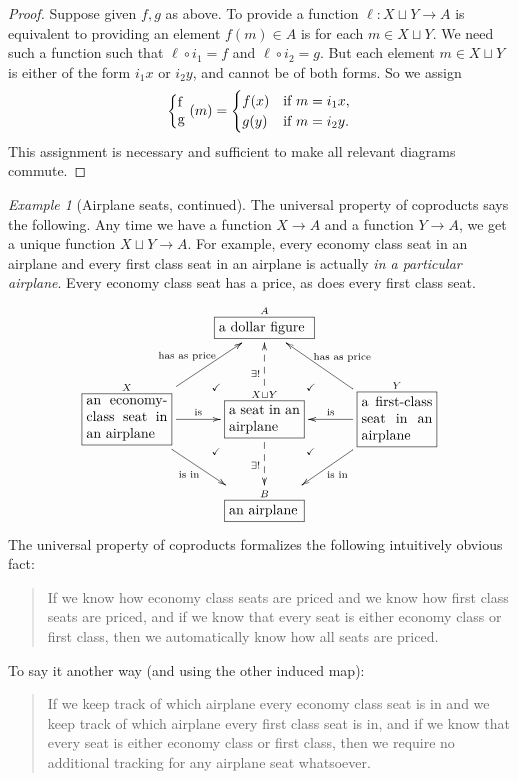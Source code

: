 \documentclass{book}
\def\tn{\textnormal}
\def\to{\rightarrow}
\def\taking{\colon}
\newcommand{\LA}[2]{\ar[#1]^-{\tn {#2}}}
\newcommand{\LAL}[2]{\ar[#1]_-{\tn {#2}}}
\newcommand{\obox}[3]{\stackrel{#1}{\fbox{\parbox{#2}{#3}}}}
\newcommand{\coprodmap}[2]{{\left\{\parbox{.1in}{#1\\#2}\right.}}
\theoremstyle{remark}
\newtheorem{example}[subsubsection]{Example}
\theoremstyle{definition}
\begin{document}
\begin{proof}

Suppose given $f,g$ as above. To provide a function $\ell\taking X\sqcup Y\to A$ is equivalent to providing an element $f(m)\in A$ is for each $m\in X\sqcup Y$. We need such a function such that $\ell\circ i_1=f$ and $\ell\circ i_2=g$. But each element $m\in X\sqcup Y$ is either of the form $i_1x$ or $i_2y$, and cannot be of both forms. So we assign 
$$\coprodmap{f}{g}(m)=\begin{cases}f(x)&\tn{if } m=i_1x,\\ g(y) &\tn{if }m=i_2y.\end{cases}$$
This assignment is necessary and sufficient to make all relevant diagrams commute.

\end{proof}

\begin{example}[Airplane seats, continued]

The universal property of coproducts says the following. Any time we have a function $X\to A$ and a function $Y\to A$, we get a unique function $X\sqcup Y\to A$. For example, every economy class seat in an airplane and every first class seat in an airplane is actually {\em in a particular airplane}. Every economy class seat has a price, as does every first class seat.
\begin{align}
\xymatrix{
&\obox{A}{.9in}{a dollar figure}&\\
\obox{X}{.8in}{an economy-class seat in an airplane}\LA{ru}{has as price}\LA{r}{is}\LAL{dr}{is in}&\obox{X\sqcup Y}{.7in}{a seat in an airplane}\ar@{-->}[d]_{\exists!}\ar@{-->}[u]^{\exists!}\ar@{}[ur]|(.35){\checkmark}\ar@{}[dl]|(.35){\checkmark}\ar@{}[dr]|(.35){\checkmark}\ar@{}[ul]|(.35){\checkmark}&\obox{Y}{.7in}{a first-class seat in an airplane}\LAL{l}{is}\LAL{lu}{has as price}\LA{dl}{is in}\\
&\obox{B}{.7in}{an airplane}&
}
\end{align}
The universal property of coproducts formalizes the following intuitively obvious fact:
\begin{quote}
If we know how economy class seats are priced and we know how first class seats are priced, and if we know that every seat is either economy class or first class, then we automatically know how all seats are priced.
\end{quote}
To say it another way (and using the other induced map):
\begin{quote}
If we keep track of which airplane every economy class seat is in and we keep track of which airplane every first class seat is in, and if we know that every seat is either economy class or first class, then we require no additional tracking for any airplane seat whatsoever.
\end{quote}

\end{example}
\end{document}
